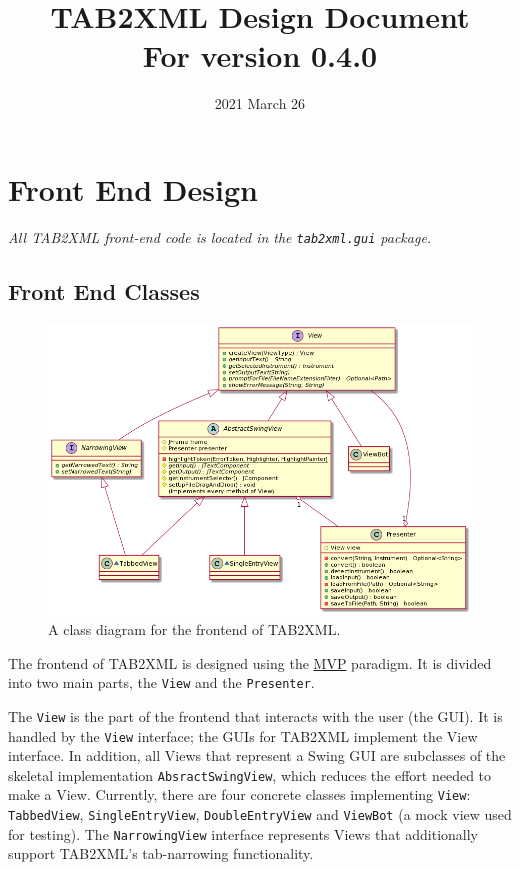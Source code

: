 \documentclass[11pt]{article}
\date{2021 March 26}
\title{TAB2XML Design Document\\\medskip
\large For version 0.4.0}
\begin{document}
\maketitle
\tableofcontents

\newpage

\section{Front End Design}
\label{sec:orge544ad9}
\emph{All TAB2XML front-end code is located in the \texttt{tab2xml.gui} package.}
\subsection{Front End Classes}
\label{sec:orgfd5f9e1}
\begin{figure}[htbp]
\centering
\includegraphics[width=.9\linewidth]{./frontend-class-diagram.png}
\caption{A class diagram for the frontend of TAB2XML.}
\end{figure}

The frontend of TAB2XML is designed using the \href{https://en.wikipedia.org/wiki/Model\%E2\%80\%93view\%E2\%80\%93presenter}{MVP} paradigm.  It is divided into two main parts, the \texttt{View} and the \texttt{Presenter}.

The \texttt{View} is the part of the frontend that interacts with the user (the GUI).  It is handled by the \texttt{View} interface; the GUIs for TAB2XML implement the View interface.  In addition, all Views that represent a Swing GUI are subclasses of the skeletal implementation \texttt{AbsractSwingView}, which reduces the effort needed to make a View.  Currently, there are four concrete classes implementing \texttt{View}: \texttt{TabbedView}, \texttt{SingleEntryView}, \texttt{DoubleEntryView} and \texttt{ViewBot} (a mock view used for testing).  The \texttt{NarrowingView} interface represents Views that additionally support TAB2XML's tab-narrowing functionality.
\end{document}
